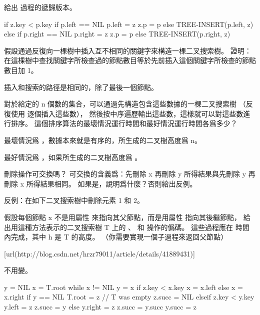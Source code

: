 \startsection[
  title={Insertion and deletion},
]

\startEXERCISE
給出  過程的遞歸版本。
\stopEXERCISE

\startANSWER
{}
\startCLRS
if z.key < p.key
	if p.left == NIL
		p.left = z
		z.p = p
	else TREE-INSERT(p.left, z)
else
	if p.right == NIL
		p.right = z
		z.p = p
	else TREE-INSERT(p.right, z)
\stopCLRS
\stopANSWER

\startEXERCISE
假設通過反復向一棵樹中插入互不相同的關鍵字來構造一棵二叉搜索樹。
證明：在這棵樹中查找關鍵字所檢查過的節點數目等於先前插入這個關鍵字所檢查的節點數目加 1。
\stopEXERCISE

\startANSWER
插入和搜索的路徑是相同的，除了最後一個節點。
\stopANSWER

\startEXERCISE
對於給定的 n 個數的集合，可以通過先構造包含這些數據的一棵二叉搜索樹
（反復使用  逐個插入這些數），
然後按中序遍歷輸出這些數，這樣就可以對這些數進行排序。
這個排序算法的最壞情況運行時間和最好情況運行時間各爲多少？
\stopEXERCISE

\startANSWER
最壞情況爲 ，數據本來就是有序的，所生成的二叉樹高度爲 n。

最好情況爲 ，如果所生成的二叉樹高度爲 。
\stopANSWER

\startEXERCISE
刪除操作可交換嗎？
可交換的含義爲：先刪除 x 再刪除 y 所得結果與先刪除 y 再刪除 x 所得結果相同。
如果是，說明爲什麼？否則給出反例。
\stopEXERCISE

\startANSWER
反例：在如下二叉搜索樹中刪除元素 1 和 2。
\externalfigure[output/e12_3_4-1]
\stopANSWER

\startEXERCISE
假設每個節點 x 不是用屬性  來指向其父節點，而是用屬性  指向其後繼節點，
給出用這種方法表示的二叉搜索樹 T 上的 、  和  操作的僞碼。
這些過程應在  時間內完成，其中 h 是 T 的高度。
（\hint 你需要實現一個子過程來返回父節點）
\stopEXERCISE

\startANSWER
{}[url(http://blog.csdn.net/hrzr79011/article/details/41889431)]

 不用變。

\startCLRS
y = NIL
x = T.root
while x != NIL
	y = x
	if z.key < x.key
		x = x.left
	else
		x = x.right
if y == NIL
	T.root = z	// T was empty
	z.succ = NIL
elseif z.key < y.key
	y.left = z
	z.succ = y
else
	y.right = z
	z.succ = y.succ
	y.succ = z
\stopCLRS

